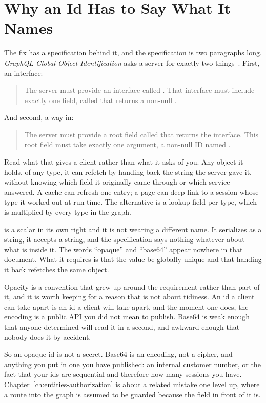 \section{Why an Id Has to Say What It Names}
\label{sec:ch04-why-an-id-has-to-say-what-it-names}

%
The fix has a specification behind it, and the specification is two paragraphs
long. \emph{GraphQL Global Object Identification} asks a server for exactly two
things~\autocite{relayobjectid}. First, an interface:

\begin{quote}
The server must provide an interface called . That interface must
include exactly one field, called  that returns a non-null .
\end{quote}

And second, a way in:

\begin{quote}
The server must provide a root field called  that returns the
 interface. This root field must take exactly one argument, a
non-null ID named .
\end{quote}

%
Read what that gives a client rather than what it asks of you. Any object it
holds, of any type, it can refetch by handing back the string the server gave
it, without knowing which field it originally came through or which service
answered. A cache can refresh one entry; a page can deep-link to a session
whose type it worked out at run time. The alternative is a lookup field per
type, which is  multiplied by every type in the graph.

%
 is a scalar in its own right and it is not  wearing a
different name. It serializes as a string, it accepts a string, and the
specification says nothing whatever about what is inside it. The words
\enquote{opaque} and \enquote{base64} appear nowhere in that document. What it
requires is that the value be globally unique and that handing it back
refetches the same object.

%
Opacity is a convention that grew up around the requirement rather than part
of it, and it is worth keeping for a reason that is not about tidiness. An id
a client can take apart is an id a client will take apart, and the moment one
does, the encoding is a public API you did not mean to publish. Base64 is weak
enough that anyone determined will read it in a second, and awkward enough
that nobody does it by accident.

%
So an opaque id is not a secret. Base64 is an encoding, not a cipher, and
anything you put in one you have published: an internal customer number, or
the fact that your ids are sequential and therefore how many sessions you
have. Chapter~\ref{ch:entities-authorization} is about a related mistake one
level up, where a route into the graph is assumed to be guarded because the
field in front of it is.
%
